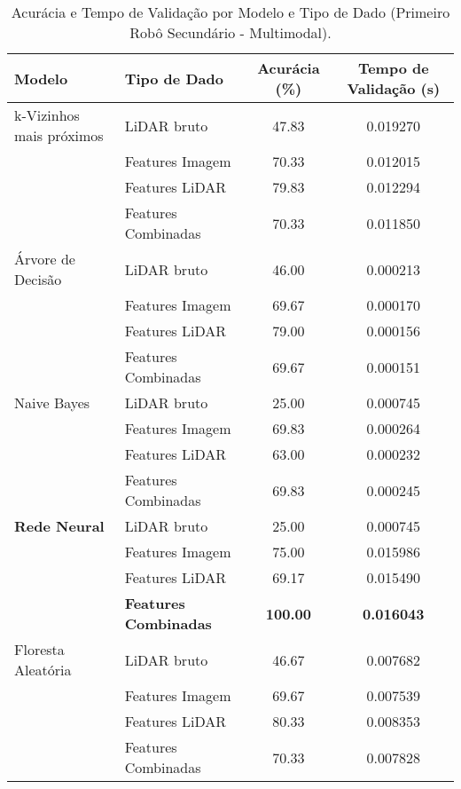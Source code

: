 \begin{table}[!ht]
\caption{Acurácia e Tempo de Validação por Modelo e Tipo de Dado (Primeiro Robô Secundário - Multimodal).}
\centering
\begin{tabular}{llcc}
\hline
\textbf{Modelo} & \textbf{Tipo de Dado} & \textbf{Acurácia (\%)} & \textbf{Tempo de Validação (s)} \\
\hline
k-Vizinhos mais próximos & LiDAR bruto & 47.83 & 0.019270 \\
                         & Features Imagem & 70.33 & 0.012015 \\
                         & Features LiDAR & 79.83 & 0.012294 \\
                         & Features Combinadas & 70.33 & 0.011850 \\
\hline
Árvore de Decisão        & LiDAR bruto & 46.00 & 0.000213 \\
                         & Features Imagem & 69.67 & 0.000170 \\
                         & Features LiDAR & 79.00 & 0.000156 \\
                         & Features Combinadas & 69.67 & 0.000151 \\
\hline
Naive Bayes              & LiDAR bruto & 25.00 & 0.000745 \\
                         & Features Imagem & 69.83 & 0.000264 \\
                         & Features LiDAR & 63.00 & 0.000232 \\
                         & Features Combinadas & 69.83 & 0.000245 \\
\hline
\textbf{Rede Neural}            & LiDAR bruto & 25.00 & 0.000745 \\ 
                         & Features Imagem & 75.00 & 0.015986 \\ 
                         & Features LiDAR & 69.17 & 0.015490 \\ 
                         & \textbf{Features Combinadas} & \textbf{100.00} & \textbf{0.016043} \\
\hline
Floresta Aleatória       & LiDAR bruto & 46.67 & 0.007682 \\
                         & Features Imagem & 69.67 & 0.007539 \\
                         & Features LiDAR & 80.33 & 0.008353 \\
                         & Features Combinadas & 70.33 & 0.007828 \\
\hline
\end{tabular}
\label{tab:resumo_robo1_secundario_tipodado}
\end{table}


